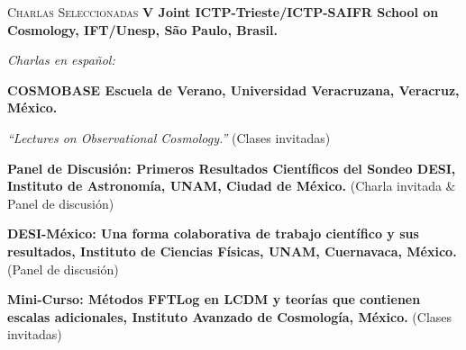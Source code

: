 \begin{rubric}{\faMicrophone \textsc{Charlas Seleccionadas}}
\entry*[]%
	\textbf{V Joint ICTP-Trieste/ICTP-SAIFR School on Cosmology, IFT/Unesp, São Paulo, Brasil.}

\vspace{0.5cm}
    \textit{Charlas en español:}
\vspace*{0.5cm}

\entry*[]%
	\textbf{COSMOBASE Escuela de Verano, Universidad Veracruzana, Veracruz, México.} \par
\emph{“Lectures on Observational Cosmology.”} (Clases invitadas)

\entry*[]%
    \textbf{Panel de Discusión: Primeros Resultados Científicos del Sondeo DESI, Instituto de Astronomía, UNAM, Ciudad de México.} (Charla invitada \& Panel de discusión)

\entry*[]%
    \textbf{DESI-México: Una forma colaborativa de trabajo científico y sus resultados, Instituto de Ciencias Físicas, UNAM, Cuernavaca, México.} (Panel de discusión)

\entry*[]%
    \textbf{Mini-Curso: Métodos FFTLog en LCDM y teorías que contienen
escalas adicionales, Instituto Avanzado de Cosmología, México.} (Clases invitadas)

\end{rubric}
